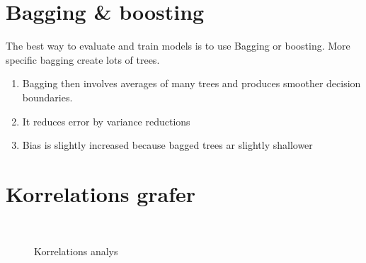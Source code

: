 \documentclass[swedish, english, 11pt ]{article}
\numberwithin{equation}{section}
\begin{document}
\clearpage

\section{Bagging \& boosting}
The best way to evaluate and train models is to use Bagging or boosting. 
More specific bagging create lots of trees.
\begin{enumerate}
	\item Bagging then involves averages of many trees and produces smoother decision boundaries.
	\item It reduces error by variance reductions
	\item Bias is slightly increased because bagged trees ar slightly  shallower
\end{enumerate}

\appendix
\section{Korrelations grafer}

\begin{figure}[ht]
\centering
\caption{Korrelations analys }
\\
\label{fig:correlation}
\end{figure}
\clearpage
\end{document}
